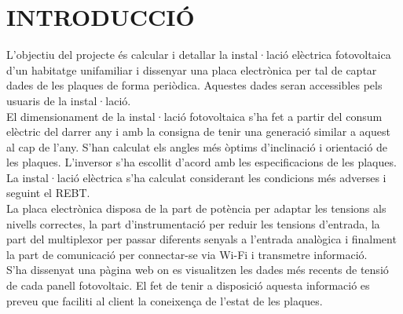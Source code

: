 \chapter{\uppercase{Introducció}}




L'objectiu del projecte és calcular i detallar la instal·lació elèctrica fotovoltaica d'un habitatge unifamiliar i dissenyar una placa electrònica per tal de captar dades de les plaques de forma periòdica. Aquestes dades seran accessibles pels usuaris de la instal·lació.\\
\newline El dimensionament de la instal·lació fotovoltaica s'ha fet a partir del consum elèctric del darrer any i amb la consigna de tenir una generació similar a aquest al cap de l'any. S'han calculat els angles més òptims d'inclinació i orientació de les plaques. L'inversor s'ha escollit d'acord amb les especificacions de les plaques. La instal·lació elèctrica s'ha calculat considerant les condicions més adverses i seguint el REBT.\\
\newline La placa electrònica disposa de la part de potència per adaptar les tensions als nivells correctes, la part d'instrumentació per reduir les tensions d'entrada, la part del multiplexor per passar diferents senyals a l'entrada analògica i finalment la part de comunicació per connectar-se via Wi-Fi i transmetre informació. \\
\newline S'ha dissenyat una pàgina web on es visualitzen les dades més recents de tensió de cada panell fotovoltaic. El fet de tenir a disposició aquesta informació es preveu que faciliti al client la coneixença de l'estat de les plaques.




\clearpage


